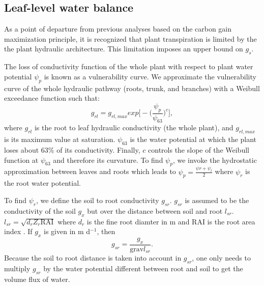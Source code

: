 \documentclass[utf8]{frontiersSCNS} %
\begin{document}
\subsection{Leaf-level water balance}

As a point of departure from previous analyses based on the carbon gain maximization principle, it is recognized that plant transpiration is limited by the the plant hydraulic architecture. This limitation imposes an upper bound on $g_s$. 


The loss of conductivity function of the whole plant with respect to plant water potential $\psi_p$ is known as a vulnerability curve. We approximate the vulnerability curve of the whole hydraulic pathway (roots, trunk, and branches) with a Weibull exceedance function such that:
\begin{equation}
    \label{eqn:root_leaf}
    g_{rl} = g_{rl,max}exp\Big[-\Big(\frac{\psi_{p}}{\psi_{63}}\Big)^c\Big],
\end{equation}
where $g_{rl}$ is the root to leaf hydraulic conductivity (the whole plant), and $g_{rl,max}$ is its maximum value at saturation. $\psi_{63}$ is the water potential at which the plant loses about 63\% of its conductivity. Finally, $c$ controls the slope of the Weibull function at $\psi_{63}$ and therefore its curvature. To find $\psi_{p}$, we invoke the hydrostatic approximation between leaves and roots which leads to $\psi_{p}=\frac{\psi{r}+\psi_l}{2}$ where $\psi_r$ is the root water potential.

To find $\psi_r$, we define the soil to root conductivity $g_{sr}$. $g_{sr}$ is assumed to be the conductivity of the soil $g_x$ but over the distance between soil and root $l_{sr}$. $l_{sr} = \sqrt{d_r Z_r \text{RAI}}$ where $d_r$ is the fine root diamter in m and RAI is the root area index \citep{Manzoni2013}. If $g_x$ is given in m d$^{-1}$, then
\begin{equation}
    \label{eqn:soil_root}
    g_{sr} = \frac{g_x}{\text{grav} l_{sr}}. 
\end{equation}
Because the soil to root distance is taken into account in $g_{sr}$, one only needs to multiply $g_{sr}$ by the water potential different between root and soil to get the volume flux of water.
\end{document}
